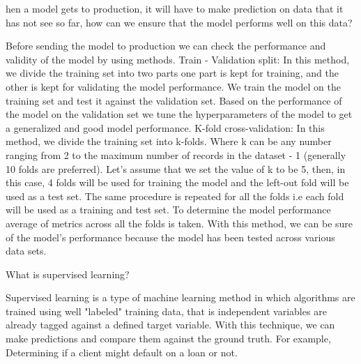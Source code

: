 	\begin{qanda}
		\begin{question}
hen a model gets to production, it will have to make prediction on data that it has not see so far, how can we ensure that the model performs well on this data?
		\end{question}
		\begin{answer}
Before sending the model to production we can check the performance and validity of the model by using methods. Train - Validation split: In this method, we divide the training set into two parts one part is kept for training, and the other is kept for validating the model performance. We train the model on the training set and test it against the validation set. Based on the performance of the model on the validation set we tune the hyperparameters of the model to get a generalized and good model performance. K-fold cross-validation: In this method, we divide the training set into k-folds. Where k can be any number ranging from 2 to the maximum number of records in the dataset - 1 (generally 10 folds are preferred). Let's assume that we set the value of k to be 5, then, in this case, 4 folds will be used for training the model and the left-out fold will be used as a test set. The same procedure is repeated for all the folds i.e each fold will be used as a training and test set. To determine the model performance average of metrics across all the folds is taken. With this method, we can be sure of the model's performance because the model has been tested across various data sets.
		\end{answer}
	\end{qanda}

	\begin{qanda}
		\begin{question}
What is supervised learning?
		\end{question}
		\begin{answer}
Supervised learning is a type of machine learning method in which algorithms are trained using well "labeled" training data, that is independent variables are already tagged against a defined target variable. With this technique, we can make predictions and compare them against the ground truth. For example, Determining if a client might default on a loan or not.
		\end{answer}
	\end{qanda}

